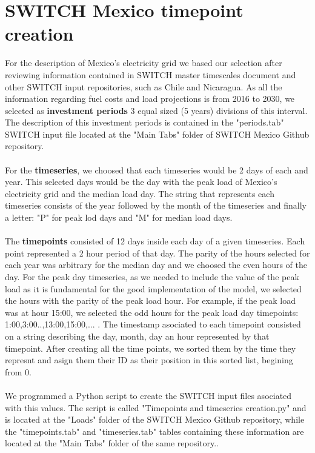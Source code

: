 \documentclass{article}
\begin{document}
\section{SWITCH Mexico timepoint creation}
For the description of Mexico's electricity grid we based our selection after reviewing information contained in SWITCH master timescales document \cite{master} and other SWITCH input repositories, such as Chile\cite{chile} and Nicaragua. As all the information regarding fuel costs and load projections is from 2016 to 2030, we selected as \textbf{investment periods} 3 equal sized (5 years) divisions of this interval. The description of this investment periods is contained in the "periods.tab"  SWITCH input file located at the "Main Tabs" folder of SWITCH Mexico Github repository\cite{repo}. 
\\
\\For the \textbf{timeseries}, we choosed that each timeseries would be 2 days of each and year. This selected days would be the day with the peak load of Mexico's electricity grid and the median load day. The string that represents each timeseries consists of the year followed by the month of the timeseries and finally a letter: "P" for peak lod days and "M" for median load days.
\\
\\The \textbf{timepoints} consisted of 12 days inside each day of a given timeseries. Each point represented a 2 hour period of that day. The parity of the hours selected for each year was arbitrary for the median day and we choosed the even hours of the day. For the peak day timeseries, as we needed to include the value of the peak load as it is fundamental for the good implementation of the model, we selected the hours with the parity of the peak load hour. For example, if the peak load was at hour 15:00, we selected the odd hours for the peak load day timepoints: 1:00,3:00..,13:00,15:00,... . The timestamp asociated to each timepoint consisted on a string describing the day, month, day an hour represented by that timepoint. After creating all the time points, we sorted them by the time they represnt and asign them their ID as their position in this sorted list, begining from 0.
\\
\\We programmed a Python script to create the SWITCH input files asociated with this values. The  script is called "Timepoints and timeseries creation.py" and is located at the "Loads" folder of the SWITCH Mexico Github repository, while the "timepoints.tab" and "timeseries.tab" tables containing these information are located at the "Main Tabs" folder of the same repository.\cite{repo}.
\end{document}
